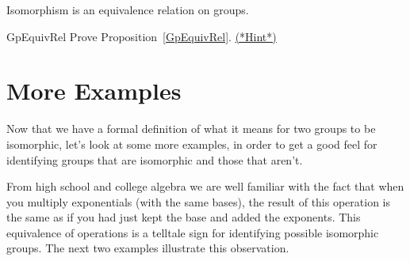 \begin{thm}\label{GpEquivRel}
Isomorphism is an equivalence relation on groups. 
\end{thm}

\begin{exercise}{GpEquivRel}
Prove Proposition~\ref{GpEquivRel}.
\hyperref[sec:isomorph:hints]{(*Hint*)}
\end{exercise}

\section{More Examples}\label{iso_more_ex}

Now that we have a formal definition of what it means for two groups to be isomorphic, let's look at some more examples, in order to get a good feel for identifying groups that are isomorphic and those that aren't.



From high school and college algebra we are well familiar with the fact that when you multiply exponentials (with the same bases), the result of this operation is the same as if you had just kept the base and added the exponents.  This equivalence of operations is a telltale sign for identifying possible isomorphic groups.  The next two examples illustrate this observation.

